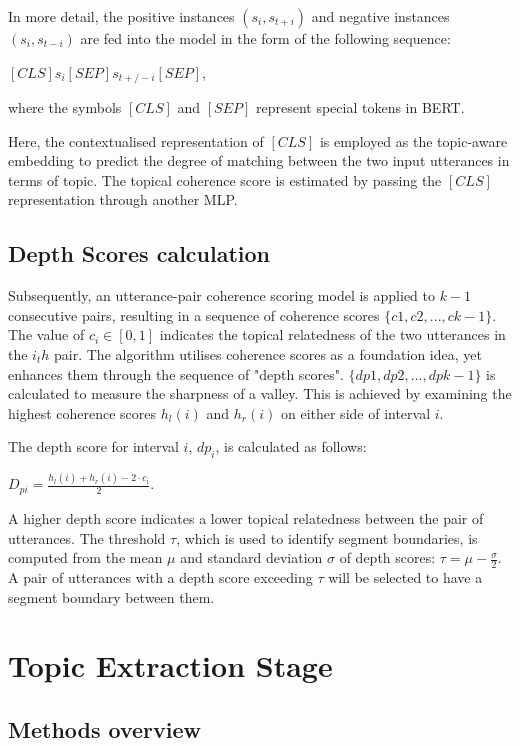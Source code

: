 \documentclass[PMI,VKR]{HSEUniversity}
\begin{document}
In more detail, the positive instances $(s_{i}, s_{t+i})$ and negative instances $(s_{i}, s_{t-i})$ are fed into the model in the form of the following sequence: 
\begin{center}
    $[CLS] s_{i} [SEP] s_{t+/-i} [SEP]$,
\end{center}
where the symbols $[CLS]$ and $[SEP]$ represent special tokens in BERT. 

Here, the contextualised representation of $[CLS]$ is employed as the topic-aware embedding to predict the degree of matching between the two input utterances in terms of topic. 
The topical coherence score is estimated by passing the $[CLS]$ representation through another MLP.


\subsection{Depth Scores calculation}

Subsequently, an utterance-pair coherence scoring model is applied to $k - 1$ consecutive pairs, resulting in a sequence of coherence scores $\{c1, c2, ..., ck-1\}$. 
The value of $c_i \in [0, 1]$ indicates the topical relatedness of the two utterances in the $i_th$ pair. 
The algorithm utilises coherence scores as a foundation idea, yet enhances them through the sequence of "depth scores". $\{dp1, dp2, ..., dpk-1\}$ is calculated to measure the sharpness of a valley. 
This is achieved by examining the highest coherence scores $h_l(i)$ and $h_r(i)$ on either side of interval $i$.

The depth score for interval $i$, $dp_i$, is calculated as follows: 
\begin{center}
    $D_{pi} = \frac{ h_{l}(i) + h_{r}(i) - 2 \cdot c_{i}}{2}$. 
\end{center}

A higher depth score indicates a lower topical relatedness between the pair of utterances. 
The threshold $\tau$, which is used to identify segment boundaries, is computed from the mean $\mu$ and standard deviation $\sigma$ of depth scores: $\tau = \mu - \frac{\sigma}{2}$. 
A pair of utterances with a depth score exceeding $\tau$ will be selected to have a segment boundary between them. 


\section{Topic Extraction Stage}


\subsection{Methods overview}
\end{document}
